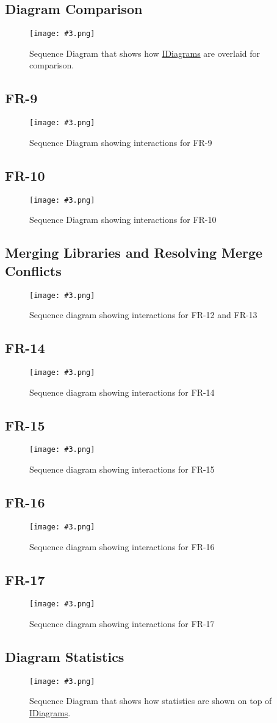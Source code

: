 \documentclass[10pt,a4paper]{report}
\newcommand{\refer}[2]{\hyperref[#1]{\textcolor{col:reference}{#2}}}
\newcommand{\includeimage}[5]{
    \begin{figure}[H]
        #1
        \texttt{[image: \#3.png]}
        \caption{#4}
        \label{fig:#5}
    \end{figure}
}
\newcommand{\packagebeginning}{edu.kit.informatik.pse.gelf} %
\newcommand{\lblroot}{lbl} %
\newcommand{\lblpackage}{} %
\newcommand{\lblpackageelement}{} %
\newcommand{\lblpackageelementmember}{} %
\newcommand{\lblpackageelementmemberparameter}{} %
\newcommand{\casclabelname}{\lblroot\lblpackage\lblpackageelement\lblpackageelementmember\lblpackageelementmemberparameter}
\newcommand{\casclabel}{\label{\casclabelname}}
\begin{document}
\subsection{Diagram Comparison}
\includeimage{}{0.32}{DiagramComparison}{Sequence Diagram that shows how \refer{\lblroot:view.diagrams:IDiagram}{IDiagrams} are overlaid for comparison.}{Diagram Comparison}
\subsection{FR-9}
\includeimage{}{0.42}{FR-9}{Sequence Diagram showing interactions for FR-9}{FR-9}
\subsection{FR-10}
\includeimage{}{0.35}{FR10}{Sequence Diagram showing interactions for FR-10}{FR-10}
\subsection{Merging Libraries and Resolving Merge Conflicts}
\includeimage{}{0.20}{FR-12,13}{Sequence diagram showing interactions for FR-12 and FR-13}{FR-12 and FR-13}
\subsection{FR-14}
\includeimage{}{0.27}{FR-14}{Sequence diagram showing interactions for FR-14}{Copying Cells into another Library}
\subsection{FR-15}
\includeimage{}{0.30}{removingalibrary}{Sequence diagram showing interactions for FR-15}{Removing Libraries}
\subsection{FR-16}
\includeimage{}{0.25}{deletingcell}{Sequence diagram showing interactions for FR-16}{Deleting Cells}
\subsection{FR-17}
\includeimage{}{0.35}{scalingvalues}{Sequence diagram showing interactions for FR-17}{Scaling Values}
\subsection{Diagram Statistics}
\includeimage{}{0.30}{DiagramStatistics}{Sequence Diagram that shows how statistics are shown on top of \refer{\lblroot:view.diagrams:IDiagram}{IDiagrams}.}{Diagram Statistics}
\end{document}
